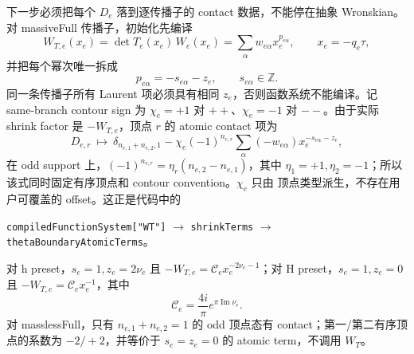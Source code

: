 ﻿\documentclass[a4paper,11pt]{article}
\begin{document}
下一步必须把每个 $D_e$ 落到逐传播子的 contact 数据，不能停在抽象 Wronskian。对 massiveFull 传播子，初始化先编译
\begin{equation}
 W_{T,e}(x_e)=\det T_e(x_e)\,W_e(x_e)
 =\sum_{\alpha}w_{e\alpha}x_e^{p_{e\alpha}},
 \qquad x_e=-q_e\tau,
 \label{WTLaurentContact}
\end{equation}
并把每个幂次唯一拆成
\begin{equation}
 p_{e\alpha}=-s_{e\alpha}-z_e,
 \qquad s_{e\alpha}\in\mathbb Z.
 \label{WTShiftSplit}
\end{equation}
同一条传播子所有 Laurent 项必须具有相同 $z_e$，否则函数系统不能编译。记 same-branch contour sign 为
$\chi_e=+1$ 对 $++$、$\chi_e=-1$ 对 $--$。由于实际 shrink factor 是 $-W_{T,e}$，顶点 $r$ 的 atomic contact 项为
\begin{equation}
 D_{e,r}\ \longmapsto\
 \delta_{n_{e,1}+n_{e,2},1}
 -\chi_e(-1)^{n_{e,r}}
  \sum_\alpha(-w_{e\alpha})x_e^{-s_{e\alpha}-z_e},
 \label{massiveDToWT}
\end{equation}
在 odd support 上，$(-1)^{n_{e,r}}=\eta_r(n_{e,2}-n_{e,1})$，其中
$\eta_1=+1,\eta_2=-1$；所以该式同时固定有序顶点和 contour convention。$\chi_e$ 只由
顶点类型派生，不存在用户可覆盖的 offset。这正是代码中的
\begin{center}
\texttt{compiledFunctionSystem["WT"]}
$\longrightarrow$
\texttt{shrinkTerms}
$\longrightarrow$
\texttt{thetaBoundaryAtomicTerms}。
\end{center}
对 h preset，$s_e=1,z_e=2\nu_e$ 且 $-W_{T,e}=\mathcal C_ex_e^{-2\nu_e-1}$；对 H preset，$s_e=1,z_e=0$ 且 $-W_{T,e}=\mathcal C_ex_e^{-1}$，其中
\begin{equation}
 \mathcal C_e=\frac{4i}{\pi}e^{\pi\operatorname{Im}\nu_e}.
\end{equation}
对 masslessFull，只有 $n_{e,1}+n_{e,2}=1$ 的 odd 顶点态有 contact；第一/第二有序顶点的系数为 $-2/+2$，并等价于 $s_e=z_e=0$ 的 atomic term，不调用 $W_T$。
\end{document}
